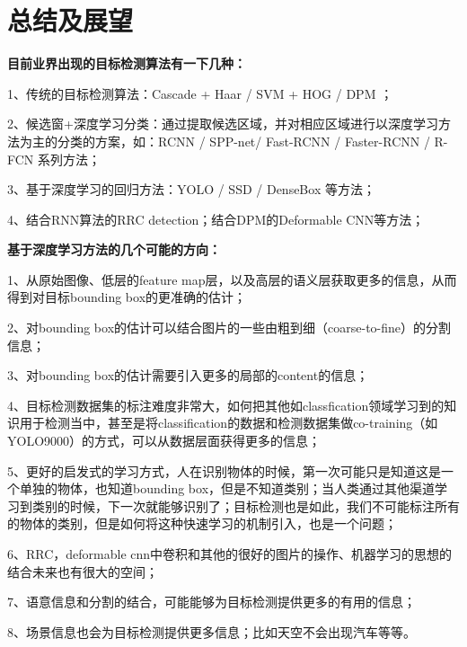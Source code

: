 \section{总结及展望}
\setcounter{figure}{0}
\textbf{目前业界出现的目标检测算法有一下几种：}

1、传统的目标检测算法：Cascade + Haar / SVM + HOG / DPM ；

2、候选窗+深度学习分类：通过提取候选区域，并对相应区域进行以深度学习方法为主的分类的方案，如：RCNN / SPP-net/ Fast-RCNN / Faster-RCNN  / R-FCN 系列方法；

3、基于深度学习的回归方法：YOLO / SSD / DenseBox 等方法；

4、结合RNN算法的RRC detection；结合DPM的Deformable CNN等方法；

\textbf{基于深度学习方法的几个可能的方向：}

1、从原始图像、低层的feature map层，以及高层的语义层获取更多的信息，从而得到对目标bounding box的更准确的估计；

2、对bounding box的估计可以结合图片的一些由粗到细（coarse-to-fine）的分割信息；

3、对bounding box的估计需要引入更多的局部的content的信息；

4、目标检测数据集的标注难度非常大，如何把其他如classfication领域学习到的知识用于检测当中，甚至是将classification的数据和检测数据集做co-training（如YOLO9000）的方式，可以从数据层面获得更多的信息；

5、更好的启发式的学习方式，人在识别物体的时候，第一次可能只是知道这是一个单独的物体，也知道bounding box，但是不知道类别；当人类通过其他渠道学习到类别的时候，下一次就能够识别了；目标检测也是如此，我们不可能标注所有的物体的类别，但是如何将这种快速学习的机制引入，也是一个问题；

6、RRC，deformable cnn中卷积和其他的很好的图片的操作、机器学习的思想的结合未来也有很大的空间；

7、语意信息和分割的结合，可能能够为目标检测提供更多的有用的信息；

8、场景信息也会为目标检测提供更多信息；比如天空不会出现汽车等等。
